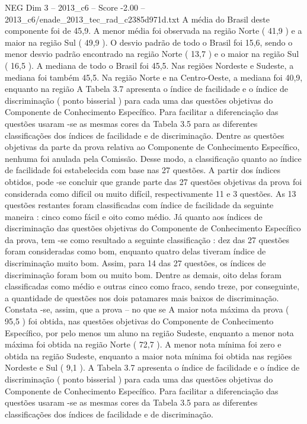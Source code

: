 \begin{textsample}{NEG Dim 3 – 2013\_c6 – Score -2.00 – 2013\_c6/enade\_2013\_tec\_rad\_c2385d971d.txt}
A média do Brasil deste componente foi de 45,9.
A menor média foi observada na região Norte ( 41,9 ) e a maior na região Sul ( 49,9 ).
O desvio padrão de todo o Brasil foi 15,6, sendo o menor desvio padrão encontrado na região Norte ( 13,7 ) e o maior na região Sul ( 16,5 ).
A mediana de todo o Brasil foi 45,5.
Nas regiões Nordeste e Sudeste, a mediana foi também 45,5.
Na região Norte e na Centro-Oeste, a mediana foi 40,9, enquanto na região A Tabela 3.7 apresenta o índice de facilidade e o índice de discriminação ( ponto bisserial ) para cada uma das questões objetivas do Componente de Conhecimento Específico.
Para facilitar a diferenciação das questões usaram -se as mesmas cores da Tabela 3.5 para as diferentes classificações dos índices de facilidade e de discriminação.
Dentre as questões objetivas da parte da prova relativa ao Componente de Conhecimento Específico, nenhuma foi anulada pela Comissão.
Desse modo, a classificação quanto ao índice de facilidade foi estabelecida com base nas 27 questões.
A partir dos índices obtidos, pode -se concluir que grande parte das 27 questões objetivas da prova foi considerada como difícil ou muito difícil, respectivamente 11 e 3 questões.
As 13 questões restantes foram classificadas com índice de facilidade da seguinte maneira : cinco como fácil e oito como médio.
Já quanto aos índices de discriminação das questões objetivas do Componente de Conhecimento Específico da prova, tem -se como resultado a seguinte classificação : dez das 27 questões foram consideradas como bom, enquanto quatro delas tiveram índice de discriminação muito bom.
Assim, para 14 das 27 questões, os índices de discriminação foram bom ou muito bom.
Dentre as demais, oito delas foram classificadas como médio e outras cinco como fraco, sendo treze, por conseguinte, a quantidade de questões nos dois patamares mais baixos de discriminação.
Constata -se, assim, que a prova – no que se A maior nota máxima da prova ( 95,5 ) foi obtida, nas questões objetivas do Componente de Conhecimento Específico, por pelo menos um aluno na região Sudeste, enquanto a menor nota máxima foi obtida na região Norte ( 72,7 ).
A menor nota mínima foi zero e obtida na região Sudeste, enquanto a maior nota mínima foi obtida nas regiões Nordeste e Sul ( 9,1 ).
A Tabela 3.7 apresenta o índice de facilidade e o índice de discriminação ( ponto bisserial ) para cada uma das questões objetivas do Componente de Conhecimento Específico.
Para facilitar a diferenciação das questões usaram -se as mesmas cores da Tabela 3.5 para as diferentes classificações dos índices de facilidade e de discriminação.

\end{textsample}
